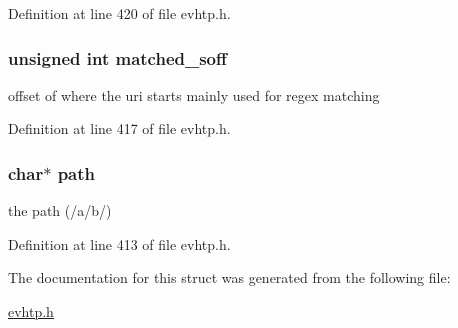Definition at line 420 of file evhtp.\-h.

\hypertarget{structevhtp__path__s_af11f4fc41ab5561c5d430cedfa5e53d8}{
\subsubsection[{matched\-\_\-soff}]{\setlength{\rightskip}{0pt plus 5cm}unsigned int matched\-\_\-soff}}\label{structevhtp__path__s_af11f4fc41ab5561c5d430cedfa5e53d8}
offset of where the uri starts mainly used for regex matching 

Definition at line 417 of file evhtp.\-h.

\hypertarget{structevhtp__path__s_a44196e6a5696d10442c29e639437196e}{
\subsubsection[{path}]{\setlength{\rightskip}{0pt plus 5cm}char$\ast$ path}}\label{structevhtp__path__s_a44196e6a5696d10442c29e639437196e}
the path (/a/b/) 

Definition at line 413 of file evhtp.\-h.



The documentation for this struct was generated from the following file\-:\begin{DoxyCompactItemize}
\item 
\hyperlink{evhtp_8h}{evhtp.\-h}\end{DoxyCompactItemize}

